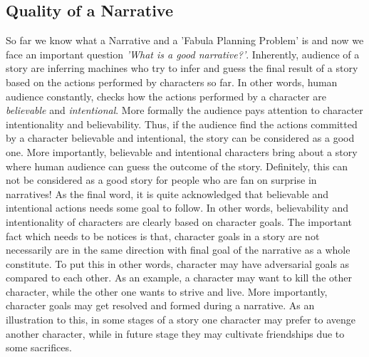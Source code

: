 \documentclass[english]{tktltiki}
\begin{document}
\subsection{Quality of a Narrative}
So far we know what a Narrative and a 'Fabula Planning Problem' is and now we face an important question \textit{'What is a good narrative?'}. \newline
Inherently, audience of a story are inferring machines who try to infer and guess the final result of a story based on the actions performed by characters so far. In other words, human audience constantly, checks how the actions performed by a character are\textit{ believable} and \textit{intentional}. More formally the audience pays attention to character intentionality and believability. Thus, if the audience find the actions committed by a character believable and intentional, the story can be considered as a good one. More importantly, believable and intentional characters bring about a story where human audience can guess the outcome of the story. Definitely, this can not be considered as a good story for people who are fan on surprise in narratives!
As the final word, it is quite acknowledged that believable and intentional actions needs some goal to follow. In other words, believability and intentionality of characters are clearly based on character goals. The important fact which needs to be notices is that, character goals in a story are not necessarily are in the same direction with final goal of the narrative as a whole constitute. To put this in other words, character may have adversarial goals as compared to each other. As an example, a character may want to kill the other character, while the other one wants to strive and live. More importantly, character goals may get resolved and formed during a narrative. As an illustration to this, in some stages of a story one character may prefer to avenge another character, while in future stage they may cultivate friendships due to some sacrifices. 
\end{document}
